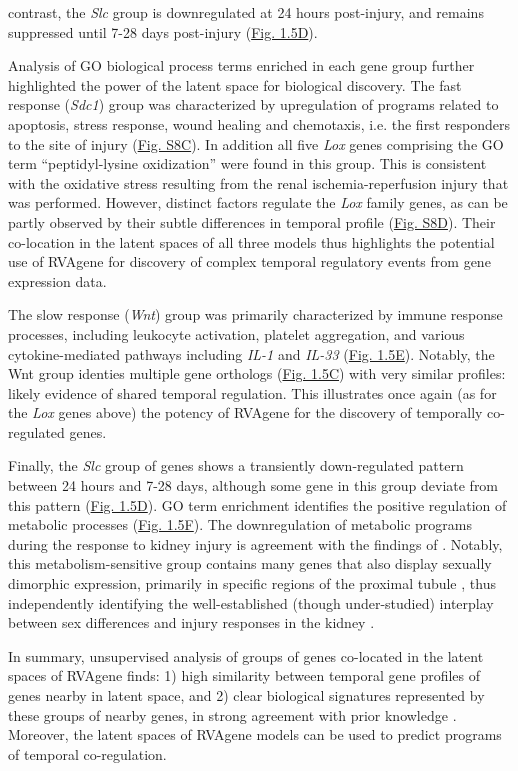 contrast, the {\em Slc} group is downregulated at 24 hours post-injury, and remains suppressed until
7-28 days post-injury (\hyperref[fig:fig6b]{Fig. 1.5D}).
\par 
Analysis of GO biological process terms enriched in each gene group further highlighted the power of the latent space for biological discovery. The fast response ({\em Sdc1}) group was characterized by upregulation of programs related to apoptosis, stress response, wound healing and chemotaxis, i.e. the first responders to the site of injury (\hyperref[supp]{Fig. S8C}). In addition all five {\em Lox} genes comprising the GO term ``peptidyl-lysine oxidization'' were found in this group. This is consistent with the oxidative stress resulting from the renal ischemia-reperfusion injury that was performed. However, distinct factors regulate the {\em Lox} family genes, as can be partly observed by their subtle differences in temporal profile (\hyperref[supp]{Fig. S8D}). Their co-location in the latent spaces of all three models thus highlights the potential use of RVAgene for discovery of complex temporal regulatory events from gene expression data.
\par
The slow response ({\em Wnt}) group was primarily characterized by immune response processes,
including leukocyte activation, platelet aggregation, and various cytokine-mediated pathways
including {\em IL-1} and {\em IL-33} (\hyperref[fig:fig6b]{Fig. 1.5E}). Notably, the Wnt group
identies multiple gene orthologs (\hyperref[fig:fig6b]{Fig. 1.5C}) with very similar profiles: likely evidence of shared temporal regulation. This illustrates once again (as for the {\em Lox} genes above) the potency of RVAgene for the discovery of temporally co-regulated genes.
\par
Finally, the {\em Slc} group of genes shows a transiently down-regulated pattern between 24 hours
and 7-28 days, although some gene in this group deviate from this pattern (\hyperref[fig:fig6b]{Fig.
1.5D}). 
GO term enrichment identifies the positive regulation of metabolic processes
(\hyperref[fig:fig6b]{Fig. 1.5F}). The downregulation of metabolic programs during the response to kidney injury is agreement with the findings of \citet{liu2017molecular}. Notably, this metabolism-sensitive group contains many genes that also display sexually dimorphic expression, primarily in specific regions of the proximal tubule \citep{ransick19_singlecell}, thus independently identifying the well-established (though under-studied) interplay between sex differences and injury responses in the kidney \citep{neugarten00_effect}. 
\par 
In summary, unsupervised analysis of groups of genes co-located in the latent spaces of RVAgene finds: 1) high similarity between temporal gene profiles of genes nearby in latent space, and 2) clear biological signatures represented by these groups of nearby genes, in strong agreement with prior knowledge \citep{liu2017molecular}. Moreover, the latent spaces of RVAgene models can be used to predict programs of temporal co-regulation. 
\par


